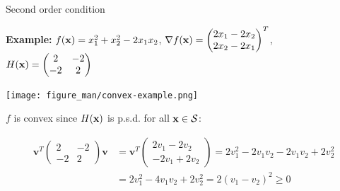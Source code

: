 \documentclass[11pt,compress,t,notes=noshow, xcolor=table]{beamer}
\begin{document}
\begin{vbframe}{Second order condition}
\begin{footnotesize}

\textbf{Example:} $f(\mathbf{x}) = x_1^2 + x_2^2 - 2x_1x_2$, $\nabla f(\mathbf{x}) = \begin{pmatrix}2x_1 - 2x_2 \\ 2x_2 - 2x_1\end{pmatrix}^T$, $H(\mathbf{x}) = \begin{pmatrix} 2 & -2 \\ -2 & 2 \end{pmatrix}
$

\begin{center}
  \texttt{[image: figure\_man/convex-example.png]}
\end{center}


$f$ is convex since $H(\mathbf{x})$ is p.s.d. for all $\mathbf{x}\in\mathcal{S}$:

\begin{align*}
    \mathbf{v}^T\begin{pmatrix} 2 & -2 \\ -2 & 2 \end{pmatrix}\mathbf{v} &= \mathbf{v}^T \begin{pmatrix} 2v_1 - 2v_2 \\ -2v_1 + 2v_2\end{pmatrix} = 2v_1^2 - 2v_1v_2 -2v_1v_2 + 2v_2^2 \\
    &= 2v_1^2 - 4v_1v_2 + 2v_2^2 = 2 (v_1 - v_2)^2 \ge 0
\end{align*}


\end{footnotesize}

\end{vbframe}
\end{document}
